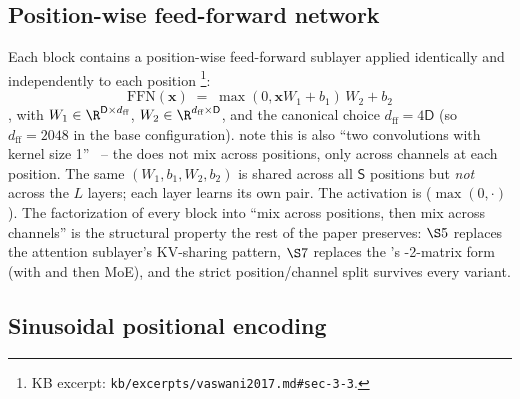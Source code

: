 \subsection{Position-wise feed-forward network}
\label{sec:canonical-ffn}

Each block contains a position-wise feed-forward sublayer applied
identically and independently to each position%
\footnote{KB excerpt: \nolinkurl{kb/excerpts/vaswani2017.md#sec-3-3}.}:
\begin{equation}
  \mathrm{FFN}(\mathbf{x}) \;=\; \max(0, \mathbf{x} W_1 + b_1) \, W_2 + b_2
  \tag{Vaswani--Eq.~2 (FFN)}
  \label{eq:vaswani-ffn}
\end{equation}
\citep[\S 3.3]{vaswani2017}, with
$W_1 \in \R^{\mathsf{D} \times d_{\text{ff}}}$,
$W_2 \in \R^{d_{\text{ff}} \times \mathsf{D}}$, and the canonical
choice $d_{\text{ff}} = 4 \mathsf{D}$ (so $d_{\text{ff}} = 2048$ in
the base configuration). \citet{vaswani2017} note this is also
``two convolutions with kernel size 1''~\citep[\S 3.3]{vaswani2017}
-- the  does not mix across positions, only across channels at
each position. The same $(W_1, b_1, W_2, b_2)$ is shared across all
$\mathsf{S}$ positions but \emph{not} across the $L$ layers; each
layer learns its own pair. The activation is 
($\max(0, \cdot)$). The factorization of every block into ``mix
across positions, then mix across channels'' is the structural
property the rest of the paper preserves: $\S 5$ replaces the
attention sublayer's KV-sharing pattern, $\S 7$ replaces the 's
-2-matrix form (with  and then MoE), and the strict
position/channel split survives every variant.

\subsection{Sinusoidal positional encoding}
\label{sec:canonical-position}

